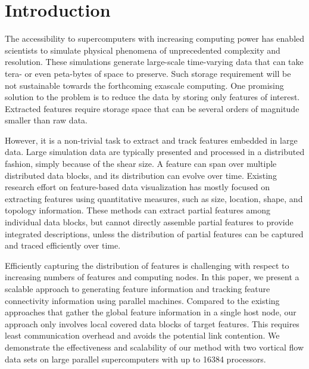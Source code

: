 \section{Introduction}

The accessibility to supercomputers with increasing computing power has enabled scientists to simulate physical phenomena of unprecedented complexity and resolution. These simulations generate large-scale time-varying data that can take tera- or even peta-bytes of space to preserve. Such storage requirement will be not sustainable towards the forthcoming exascale computing. One promising solution to the problem is to reduce the data by storing only features of interest. Extracted features require storage space that can be several orders of magnitude smaller than raw data.

However, it is a non-trivial task to extract and track features embedded in large data. Large simulation data are typically presented and processed in a distributed fashion, simply because of the shear size. A feature can span over multiple distributed data blocks, and its distribution can evolve over time. Existing research effort on feature-based data visualization has mostly focused on extracting features using quantitative measures, such as size, location, shape, and topology information. These methods can extract partial features among individual data blocks, but cannot directly assemble partial features to provide integrated descriptions, unless the distribution of partial features can be captured and traced efficiently over time.


Efficiently capturing the distribution of features is challenging with respect to increasing numbers of features and computing nodes. In this paper, we present a scalable approach to generating feature information and tracking feature connectivity information using parallel machines. Compared to the existing approaches that gather the global feature information in a single host node, our approach only involves local covered data blocks of target features. This requires least communication overhead and avoids the potential link contention. We demonstrate the effectiveness and scalability of our method with two vortical flow data sets on large parallel supercomputers with up to 16384 processors.

